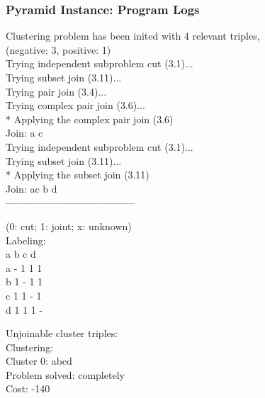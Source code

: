\begin{frame}
    \frametitle{Pyramid Instance: Program Logs}
    \footnotesize
    Clustering problem has been inited with 4 relevant triples,\\
    (negative: 3, positive: 1)\\
    Trying independent subproblem cut (3.1)...\\
    Trying subset join (3.11)...\\
    Trying pair join (3.4)...\\
    Trying complex pair join (3.6)...\\
    * Applying the complex pair join (3.6)\\
    Join: a c \\
    \vspace{5px}
    Trying independent subproblem cut (3.1)...\\
    Trying subset join (3.11)...\\
    * Applying the subset join (3.11)\\
    Join: ac b d \\
    ---------------------------------------\\
    \begin{minipage}{0.49\textwidth}
        (0: cut; 1: joint; x: unknown)\\
        Labeling:\\
        \hspace{7px}a b c d\\ 
        a - 1 1 1\\ 
        b 1 - 1 1\\ 
        c 1 1 - 1\\ 
        d 1 1 1 -
    \end{minipage}
    \begin{minipage}{0.49\textwidth}
        Unjoinable cluster triples:\\ 
        \vspace{5px}
        Clustering:\\ 
        Cluster 0: abcd\\
        \vspace{5px}
        Problem solved: completely\\
        Cost: -140
    \end{minipage}
\end{frame}





